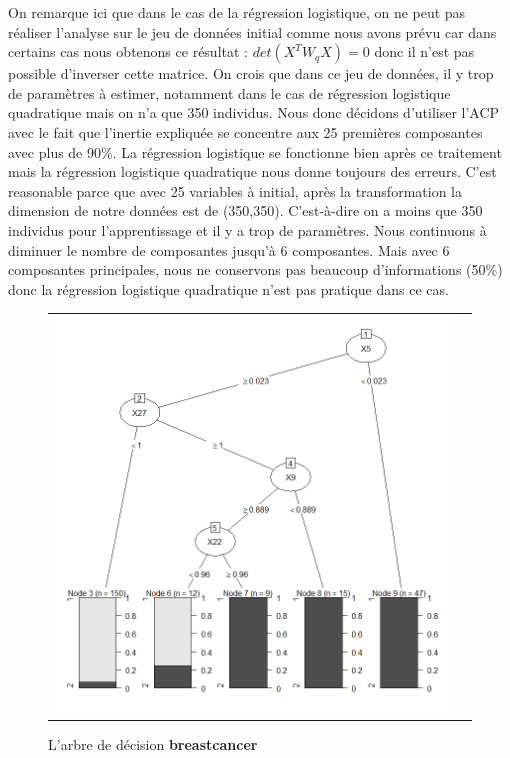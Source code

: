 \documentclass[a4paper,11pt,oneside,roman]{article}
\begin{document}
On remarque ici que dans le cas de la régression logistique, on ne peut pas réaliser l'analyse sur le jeu de données initial comme nous avons prévu car dans certains cas nous obtenons ce résultat : $det(X^{T}W_{q}X) =  0$ donc il n'est pas possible d'inverser cette matrice. On crois que dans ce jeu de données, il y trop de paramètres à estimer, notamment dans le cas de régression logistique quadratique mais on n'a que 350 individus. Nous donc décidons d'utiliser l'ACP avec le fait que l'inertie expliquée se concentre aux 25 premières composantes avec plus de 90\%. La régression logistique se fonctionne bien après ce traitement mais la régression logistique quadratique nous donne toujours des erreurs. C'est reasonable parce que avec 25 variables à initial, après la transformation la dimension de notre données est de (350,350). C'est-à-dire on a moins que 350 individus pour l'apprentissage et il y a trop de paramètres. Nous continuons à diminuer le nombre de composantes jusqu'à 6 composantes. Mais avec 6 composantes principales, nous ne conservons pas beaucoup d'informations (50\%) donc la régression logistique quadratique n'est pas pratique dans ce cas. \newline
\begin{figure}[htb]
    \centering
    \begin{tabular}{cc}
    \includegraphics[scale = .4]{./discrimination/ionosphere/tree_plot.png} &
    \end{tabular}
    \caption{L'arbre de décision \textbf{breastcancer}}
    \label{fig:my_label}
\end{figure}
\end{document}
